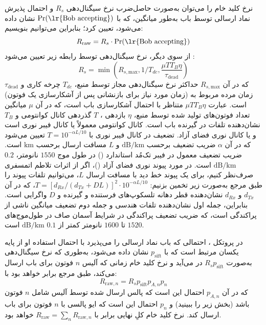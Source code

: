 نرخ کلید خام را می‌توان به‌صورت حاصل‌ضرب نرخ سیگنال‌دهی $R_s$ و احتمال پذیرش نماد ارسالی توسط باب به‌طور میانگین، که با $\text{Pr}(\text{\lr{Bob accepting}})$ نشان داده می‌شود، تعیین کرد؛ بنابراین می‌توانیم بنویسیم:
\begin{equation}
	R_{\text{raw}} = R_s \cdot \text{Pr}(\text{\lr{Bob accepting}})
	\label{eq:7-29}
\end{equation}
از سوی دیگر، نرخ سیگنال‌دهی توسط رابطه زیر تعیین می‌شود \cite{7-46}:
\begin{equation}
	R_s = \min \left( R_{s, \text{max}} , 1/T_{dc}, \frac{\mu T T_B \eta}{\tau_{\text{dead}}} \right)
	\label{eq:7-30}
\end{equation}
که در آن $R_{s, \text{max}}$ حداکثر نرخ سیگنال‌دهی مجاز توسط منبع، $T_{dc}$ چرخه کاری و $\tau_{\text{dead}}$ زمان مرده مربوط به  (زمان مورد نیاز برای بازنشانی  پس از آشکارسازی یک فوتون) است. عبارت $\mu T T_B \eta$ متناظر با احتمال آشکارسازی باب است، که در آن $\mu$ میانگین تعداد فوتون‌های تولید شده توسط منبع، $\eta$ بازدهی ، $T$ گذردهی کانال کوانتومی و $T_B$ نشان‌دهنده تلفات در گیرنده باب است. کانال کوانتومی معمولاً یا کانال فیبر نوری است و یا کانال نوری فضای آزاد. تضعیف در کانال فیبر نوری با $T = 10^{-\alpha L / 10}$ تعیین می‌شود که در آن $\alpha$ ضریب تضعیف برحسب $\text{dB/km}$ و $L$ مسافت ارسال برحسب $\text{km}$ است. ضریب تضعیف معمول در فیبر تک‌مُد استاندارد () در طول موج $1550$ نانومتر، $0.2$ $\text{dB/km}$ است. در مورد پیوند نوری فضای آزاد ()، اگر از اثرات تلاطم اتمسفری صرف‌نظر کنیم، برای یک پیوند خط دید با مسافت ارسال $L$، می‌توانیم تلفات پیوند  را طبق مرجع \cite{7-47} به‌صورت زیر تخمین بزنیم:
$T = [d_{Rx}/(d_{Tx} + DL)]^2 \cdot 10^{-\alpha L / 10}$، که در آن $d_{Tx}$ و $d_{Rx}$ نشان‌دهنده قطر دهانه تلسکوپ‌های فرستنده و گیرنده و $D$ واگرایی است. بنابراین، جمله اول نشان‌دهنده تلفات هندسی و جمله دوم تضعیف میانگین ناشی از پراکندگی است، که ضریب تضعیف پراکندگی در شرایط آسمان صاف در طول‌موج‌های $1520$ تا $1600$ نانومتر کمتر از $0.1$ $\text{dB/km}$ است.

در پروتکل ، احتمالی که باب نماد ارسالی را می‌پذیرد با احتمال استفاده او از پایه یکسان مرتبط است که با $p_{\text{sift}}$ نشان داده می‌شود، به‌طوری که نرخ سیگنال‌دهی به‌صورت $R_s p_{\text{sift}}$ در می‌آید و نرخ کلید خام زمانی که آلیس $n$ فوتون برای باب ارسال می‌کند، طبق مرجع \cite{7-46} برابر خواهد بود با:
\begin{equation}
	R_{\text{raw}, n} = R_s p_{\text{sift}} p_{A, n} p_n
	\label{eq:7-31}
\end{equation}
که در آن $p_{A, n}$ احتمال این است که پالس ارسال شده توسط آلیس شامل $n$ فوتون باشد (بخش زیر را ببینید) و $p_n$ احتمال این است که ایو پالسی با $n$ فوتون برای باب ارسال کند. نرخ کلید خام کلِ نهایی برابر با $R_{\text{raw}} = \sum_n R_{\text{raw}, n}$ خواهد بود.

